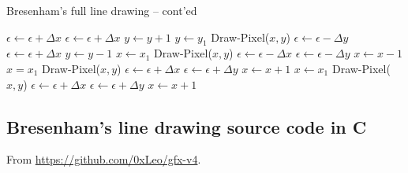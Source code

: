 \documentclass[a4paper]{article}
\begin{document}
\begin{algorithm}[H]
\caption{Bresenham's full line drawing -- cont'ed}
\label{alg:bres_pt2}
\begin{algorithmic}[1]
	\Indent
	\State $\epsilon \leftarrow \epsilon + \Delta x$
		\State $\epsilon \leftarrow \epsilon + \Delta x$
		\State $y \leftarrow y + 1$
	  
		\State $y\leftarrow y_1$
			\State Draw-Pixel($x,y$)
			\State $\epsilon \leftarrow \epsilon - \Delta y$
				\State $\epsilon \leftarrow \epsilon + \Delta x$
				\State $y \leftarrow y - 1$
			\EndIf
		\EndFor
	 
		\State $x\leftarrow x_1$
			\State Draw-Pixel($x,y$)
			\State $\epsilon \leftarrow \epsilon - \Delta x$
				\State $\epsilon \leftarrow \epsilon - \Delta y$
				\State $x \leftarrow x - 1$
			\EndIf
		\EndFor
	 
		\State $x = x_1$
			\State Draw-Pixel($x,y$)
			\State $\epsilon \leftarrow \epsilon + \Delta x$
				\State $\epsilon \leftarrow \epsilon + \Delta y$
				\State $x\leftarrow x+1$
			\EndIf
		\EndFor
	 
		\State $x\leftarrow x_1$
			\State Draw-Pixel($x,y$)
			\State $\epsilon \leftarrow \epsilon + \Delta x$
				\State $\epsilon \leftarrow \epsilon + \Delta y$
				\State $x\leftarrow x+ 1$
			\EndIf
		\EndFor
	 
	\State {}
	\EndIf
	\EndIndent
\end{algorithmic}
\end{algorithm}


\newpage
\subsection{Bresenham's line drawing source code in C}
\label{app:bresenham_full_src}

From \url{https://github.com/0xLeo/gfx-v4}.




\newpage
\end{document}
